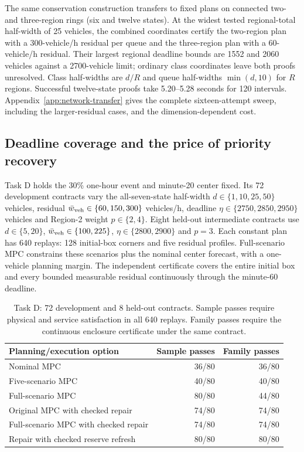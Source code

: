 \documentclass[journal,10pt]{IEEEtran}
\newcommand{\appref}[1]{Appendix~\ref{#1}}
\begin{document}
The same conservation construction transfers to fixed plans on connected
two- and three-region rings (six and twelve states). At the widest tested
regional-total half-width of 25 vehicles, the combined coordinates certify
the two-region plan with a 300-vehicle/h residual per queue and the
three-region plan with a 60-vehicle/h residual. Their largest regional
deadline bounds are 1552 and 2060 vehicles against a 2700-vehicle limit;
ordinary class coordinates leave both proofs unresolved. Class half-widths
are $d/R$ and queue half-widths $\min(d,10)$ for $R$ regions. Successful
twelve-state proofs take 5.20--5.28 seconds for 120 intervals.
\appref{app:network-transfer} gives the complete sixteen-attempt sweep,
including the larger-residual cases, and the dimension-dependent cost.

\subsection{Deadline coverage and the price of priority recovery}
\label{sec:repair-results}

Task D holds the 30\% one-hour event and minute-20 center fixed. Its 72
development contracts vary the all-seven-state half-width
$d\in\{1,10,25,50\}$ vehicles, residual
$\bar w_{\rm veh}\in\{60,150,300\}$ vehicles/h, deadline
$\eta\in\{2750,2850,2950\}$ vehicles and Region-2 weight $p\in\{2,4\}$.
Eight held-out intermediate contracts use $d\in\{5,20\}$,
$\bar w_{\rm veh}\in\{100,225\}$, $\eta\in\{2800,2900\}$ and $p=3$.
Each constant plan has 640 replays: 128 initial-box corners and five
residual profiles. Full-scenario MPC constrains these scenarios plus the
nominal center forecast, with a one-vehicle planning margin. The independent
certificate covers the entire initial box and every bounded measurable
residual continuously through the minute-60 deadline.

\begin{table}[t]
\centering\small
\caption{Task D: 72 development and 8 held-out contracts. Sample passes
require physical and service satisfaction in all 640 replays. Family passes
require the continuous enclosure certificate under the same contract.}
\label{tab:benchmark-deadlines}
\begin{tabular}{@{}lrr@{}}
\toprule
Planning/execution option & Sample passes & Family passes\\
\midrule
Nominal MPC & 36/80 & 36/80\\
Five-scenario MPC & 40/80 & 40/80\\
Full-scenario MPC & 80/80 & 44/80\\
Original MPC with checked repair & 74/80 & 74/80\\
Full-scenario MPC with checked repair & 74/80 & 74/80\\
Repair with checked reserve refresh & 80/80 & 80/80\\
\bottomrule
\end{tabular}
\end{table}
\end{document}
